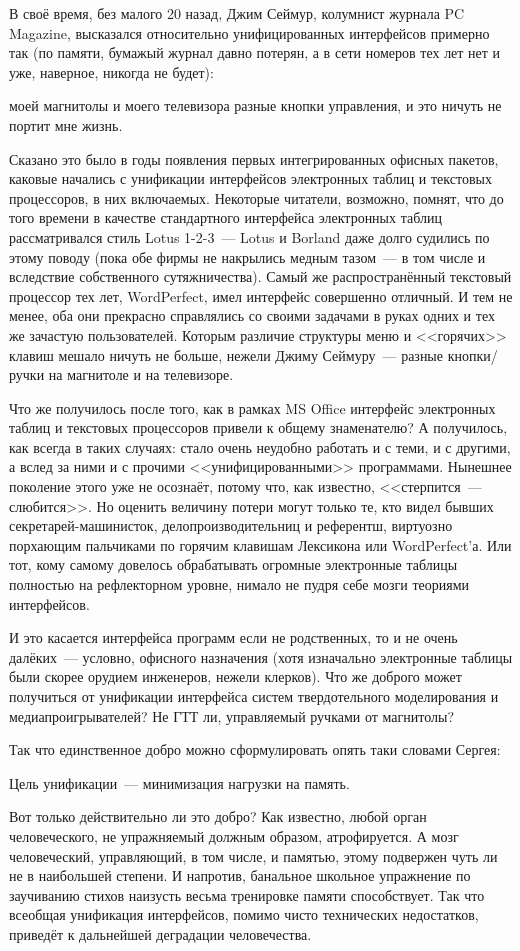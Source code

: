 В своё время, без малого 20 назад, Джим Сеймур, колумнист журнала PC Magazine, высказался относительно унифицированных интерфейсов примерно так (по памяти, бумажый журнал давно потерян, а в сети номеров тех лет нет и уже, наверное, никогда не будет):
\begin{shadequote}{}
 моей магнитолы и моего телевизора разные кнопки управления, и это ничуть не портит мне жизнь.
\end{shadequote}

Сказано это было в годы появления первых интегрированных офисных пакетов, каковые начались с унификации интерфейсов электронных таблиц и текстовых процессоров, в них включаемых. Некоторые читатели, возможно, помнят, что до того времени в качестве стандартного интерфейса электронных таблиц рассматривался стиль Lotus 1-2-3~--- Lotus и Borland даже долго судились по этому поводу (пока обе фирмы не накрылись медным тазом~--- в том числе и вследствие собственного сутяжничества). Самый же распространённый текстовый процессор тех лет, WordPerfect, имел интерфейс совершенно отличный. И тем не менее, оба они прекрасно справлялись со своими задачами в руках одних и тех же зачастую пользователей. Которым различие структуры меню и <<горячих>> клавиш мешало ничуть не больше, нежели Джиму Сеймуру~--- разные кнопки/ручки на магнитоле и на телевизоре.

Что же получилось после того, как в рамках MS Office  интерфейс электронных таблиц и текстовых процессоров привели к общему знаменателю? А получилось, как всегда в таких случаях: стало очень неудобно работать и с теми, и с другими, а вслед за ними и с прочими <<унифицированными>> программами. Нынешнее поколение этого уже не осознаёт, потому что, как известно, <<стерпится~--- слюбится>>. Но оценить величину потери могут только те, кто видел бывших секретарей-машинисток, делопроизводительниц и референтш, виртуозно порхающим пальчиками по горячим клавишам Лексикона или WordPerfect'а. Или тот, кому самому довелось обрабатывать огромные электронные таблицы полностью на рефлекторном уровне, нимало не пудря себе мозги теориями интерфейсов.

И это касается интерфейса программ если не родственных, то и не очень далёких~--- условно, офисного назначения (хотя изначально электронные таблицы были скорее орудием инженеров, нежели клерков). Что же доброго может получиться от унификации интерфейса систем твердотельного моделирования и медиапроигрывателей? Не ГТТ ли, управляемый ручками от магнитолы?

Так что единственное добро можно сформулировать опять таки словами Сергея:
\begin{shadequote}{}
Цель унификации~--- минимизация нагрузки на память.
\end{shadequote}
Вот только действительно ли это добро? Как известно, любой орган человеческого, не упражняемый должным образом, атрофируется. А мозг человеческий, управляющий, в том числе, и памятью, этому подвержен чуть ли не в наибольшей степени. И напротив, банальное школьное упражнение по заучиванию стихов наизусть весьма тренировке памяти способствует. Так что всеобщая унификация интерфейсов, помимо чисто технических недостатков, приведёт к дальнейшей деградации человечества.

